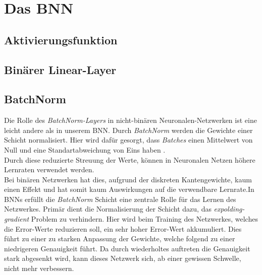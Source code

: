 \chapter{Das BNN}
\section{Aktivierungsfunktion}
\section{Binärer Linear-Layer}
\section{BatchNorm}
Die Rolle des \textit{BatchNorm-Layers} in nicht-binären Neuronalen-Netzwerken ist eine leicht andere als in unserem BNN. Durch \textit{BatchNorm} werden die Gewichte einer Schicht normalisiert. Hier wird dafür gesorgt, dass \textit{Batches} einen Mittelwert von Null und eine Standartabweichung von Eins haben\cite{batchnorm} .\\ 
Durch diese reduzierte Streuung der Werte, können in Neuronalen Netzen höhere Lernraten verwendet werden.\\
Bei binären Netzwerken hat dies, aufgrund der diskreten Kantengewichte, kaum einen Effekt und hat somit kaum Auswirkungen auf die verwendbare Lernrate.In BNNs erfüllt die \textit{BatchNorm} Schicht eine zentrale Rolle für das Lernen des Netzwerkes. Primär dient die Normalisierung der Schicht dazu, das \textit{expolding-gradient} Problem zu verhindern. Hier wird beim Training des Netzwerkes, welches die Error-Werte reduzieren soll, ein sehr hoher Error-Wert akkumuliert. Dies führt zu einer zu starken Anpassung der Gewichte, welche folgend zu einer niedrigeren Genauigkeit führt. Da durch wiederholtes auftreten die Genauigkeit stark abgesenkt wird, kann dieses Netzwerk sich, ab einer gewissen Schwelle, nicht mehr verbessern.%
